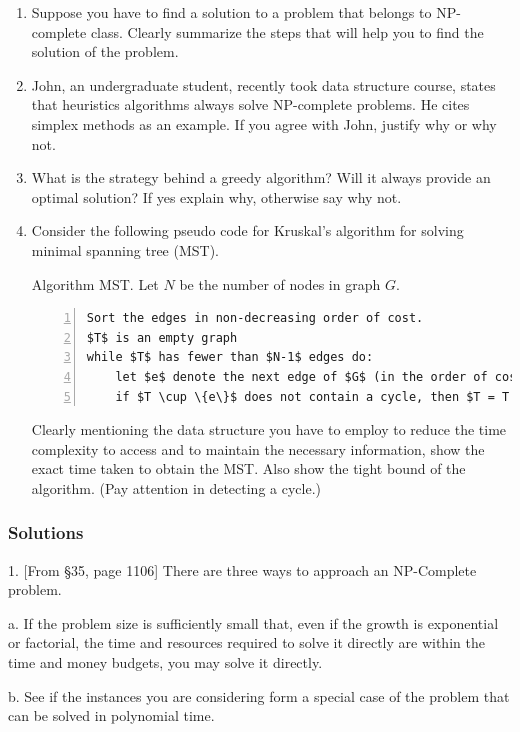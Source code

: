 \begin{enumerate}
		\item Suppose you have to find a solution to a problem that belongs to NP-complete class.  Clearly summarize the steps that will help you to find the solution of the problem.  
		\item John, an undergraduate student, recently took data structure course, states that heuristics algorithms always solve NP-complete problems.  He cites simplex methods as an example.  If you agree with John, justify why or why not.  
		\item What is the strategy behind a greedy algorithm?  Will it always provide an optimal solution?  If yes explain why, otherwise say why not.  
		\item Consider the following pseudo code for Kruskal's algorithm for solving minimal spanning tree (MST).

Algorithm MST.  Let $N$ be the number of nodes in graph $G$.  

\begin{lstlisting}[numbers=left, mathescape=True]
Sort the edges in non-decreasing order of cost.
$T$ is an empty graph
while $T$ has fewer than $N-1$ edges do:
	let $e$ denote the next edge of $G$ (in the order of cost)
	if $T \cup \{e\}$ does not contain a cycle, then $T = T \cup \{e\}$
\end{lstlisting}

Clearly mentioning the data structure you have to employ to reduce the time complexity to access and to maintain the necessary information, show the exact time taken to obtain the MST.  Also show the tight bound of the algorithm.  (Pay attention in detecting a cycle.)
\end{enumerate}

\subsubsection{Solutions}

1.  [From \S 35, page 1106]  There are three ways to approach an NP-Complete problem.  

a.  If the problem size is sufficiently small that, even if the growth is exponential or factorial, the time and resources required to solve it directly are within the time and money budgets, you may solve it directly.  

b.  See if the instances you are considering form a special case of the problem that can be solved in polynomial time.  

